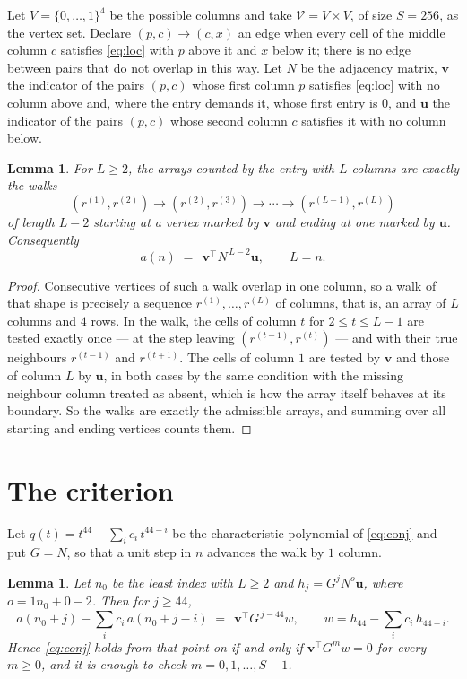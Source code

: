 \documentclass[11pt,a4paper]{article}
\theoremstyle{plain}
\newtheorem{lemma}[theorem]{Lemma}
\theoremstyle{definition}
\begin{document}
Let $V=\{0,\dots,1\}^{4}$ be the possible columns and take
$\mathcal V=V\times V$, of size $S=256$, as the vertex set. Declare $(p,c)\to(c,x)$ an edge
when every cell of the middle column $c$ satisfies \eqref{eq:loc} with $p$ above it and $x$
below it; there is no edge between pairs that do not overlap in this way. Let $N$ be the
adjacency matrix, $\mathbf{v}$ the indicator of the pairs $(p,c)$ whose first column $p$
satisfies \eqref{eq:loc} with no column above and, where the entry demands it, whose first entry is $0$, and $\mathbf{u}$ the indicator of
the pairs $(p,c)$ whose second column $c$ satisfies it with no column below.

\begin{lemma}\label{lem:walk}
For $L\ge2$, the arrays counted by the entry with $L$ columns are exactly the walks
\[
(r^{(1)},r^{(2)})\to(r^{(2)},r^{(3)})\to\cdots\to(r^{(L-1)},r^{(L)})
\]
of length $L-2$ starting at a vertex marked by $\mathbf{v}$ and ending at one marked by
$\mathbf{u}$. Consequently
\[
a(n)\;=\;\,\mathbf{v}^{\!\top}N^{\,L-2}\mathbf{u},\qquad L=n .
\]
\end{lemma}

\begin{proof}
Consecutive vertices of such a walk overlap in one column, so a walk of that shape is
precisely a sequence $r^{(1)},\dots,r^{(L)}$ of columns, that is, an array of $L$ columns
and $4$ rows. In the walk, the cells of column $t$ for $2\le t\le L-1$ are tested
exactly once --- at the step leaving $(r^{(t-1)},r^{(t)})$ --- and with their true
neighbours $r^{(t-1)}$ and $r^{(t+1)}$. The cells of column $1$ are tested by
$\mathbf{v}$ and those of column $L$ by $\mathbf{u}$, in both cases by the same condition
with the missing neighbour column treated as absent, which is how the array itself behaves at
its boundary. So the walks are exactly the admissible arrays, and summing over all starting
and ending vertices counts them.
\end{proof}

\section{The criterion}

Let $q(t)=t^{44}-\sum_i c_i\,t^{44-i}$ be the characteristic polynomial of
\eqref{eq:conj} and put $G=N$, so that a unit step in $n$ advances the walk by
$1$ column.

\begin{lemma}\label{lem:crit}
Let $n_0$ be the least index with $L\ge2$ and $h_j=G^{j}N^{o}\mathbf{u}$, where
$o=1n_0+0-2$. Then for $j\ge44$,
\[
a(n_0+j)-\sum_i c_i\,a(n_0+j-i)\;=\;\,\mathbf{v}^{\!\top}G^{\,j-44}w,
\qquad w=h_{44}-\sum_i c_i\,h_{44-i} .
\]
Hence \eqref{eq:conj} holds from that point on if and only if
$\mathbf{v}^{\!\top}G^{m}w=0$ for every $m\ge0$, and it is enough to check
$m=0,1,\dots,S-1$.
\end{lemma}
\end{document}
